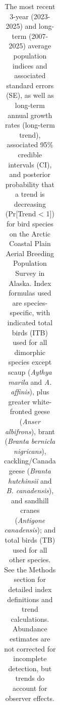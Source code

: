 \documentclass[
]{article}
\begin{document}
\begingroup\fontsize{10}{12}\selectfont

\begin{longtable}[t]{llrrrrcc}

\caption{\label{tbl-results}The most recent 3-year (2023-2025) and
long-term (2007-2025) average population indices and associated standard
errors (SE), as well as long-term annual growth rates (long-term trend),
associated 95\% credible intervals (CI), and posterior probability that
a trend is decreasing (Pr{[}Trend \textless{} 1{]}) for bird species on
the Arctic Coastal Plain Aerial Breeding Population Survey in Alaska.
Index formulas used are species-specific, with indicated total birds
(ITB) used for all dimorphic species except scaup (\emph{Aythya marila}
and \emph{A. affinis}), plus greater white-fronted geese (\emph{Anser
albifrons}), brant (\emph{Branta bernicla nigricans}), cackling/Canada
geese (\emph{Branta hutchinsii} and \emph{B. canadensis}), and sandhill
cranes (\emph{Antigone canadensis}); and total birds (TB) used for all
other species. See the Methods section for detailed index definitions
and trend calculations. Abundance estimates are not corrected for
incomplete detection, but trends do account for observer effects.}

\tabularnewline


\end{longtable}
\end{document}
